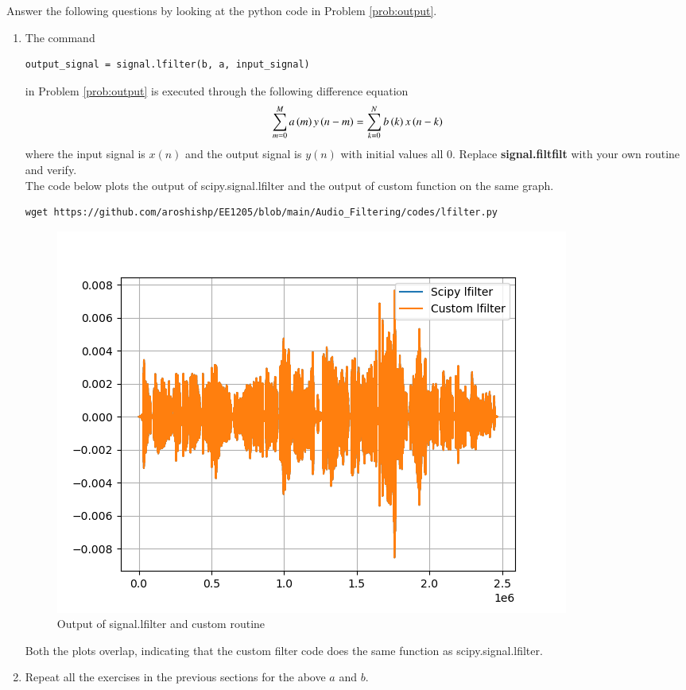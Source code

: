 \documentclass[journal,12pt,twocolumn]{IEEEtran}
\theoremstyle{remark}
\renewcommand\thesection{\arabic{section}}
\numberwithin{equation}{subsection}
\begin{document}
Answer the following questions by looking at the python code in Problem \ref{prob:output}.
\begin{enumerate}[label=\thesection.\arabic*]
\item
The command
\begin{lstlisting}
output_signal = signal.lfilter(b, a, input_signal)
	\end{lstlisting}
in Problem \ref{prob:output} is executed through the following difference equation
\begin{equation}
\label{eq:iir_filter_gen}
 \sum _{m=0}^{M}a\left(m\right)y\left(n-m\right)=\sum _{k=0}^{N}b\left(k\right)x\left(n-k\right)
\end{equation}
%
where the input signal is $x(n)$ and the output signal is $y(n)$ with initial values all 0. Replace
\textbf{signal.filtfilt} with your own routine and verify.
\\

\solution The code below plots the output of scipy.signal.lfilter and the output of custom function on the same graph.
\begin{lstlisting}
wget https://github.com/aroshishp/EE1205/blob/main/Audio_Filtering/codes/lfilter.py
\end{lstlisting}
\begin{figure}[!h]
    \centering
    \includegraphics[width = \columnwidth]{figs/lfilter.png}
    \caption{Output of signal.lfilter and custom routine}
    \label{fig:7.1}
\end{figure}
Both the plots overlap, indicating that the custom filter code does the same function as scipy.signal.lfilter.
\item Repeat all the exercises in the previous sections for the above $a$ and $b$.\\


\end{enumerate}
\end{document}
